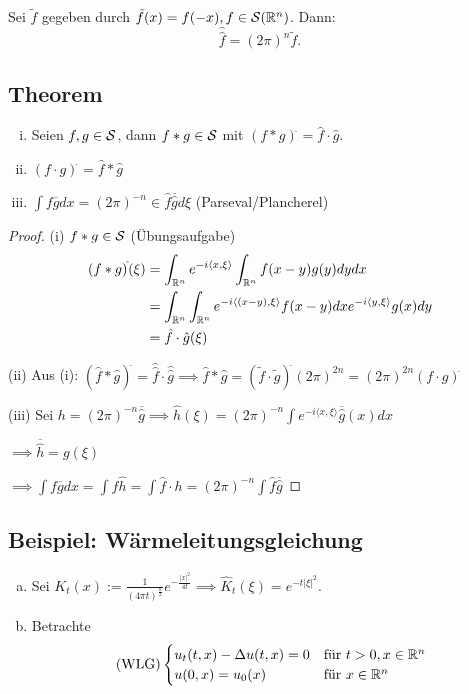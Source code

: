 Sei $\tilde f$ gegeben durch $\tilde f(x) = f(-x), f\in \mathcal{S}(\mathbb{R}^n)$.
Dann:
$$
\hat{\hat{f}} = (2\pi)^n \tilde f.
$$

\subsection{Theorem}

\begin{enumerate}[(i)]
  \item Seien $f, g \in \mathcal{S}$, dann $f \ast g \in \mathcal{S}$ mit $(f \ast g)^{\hat{}} = \hat f \cdot \hat g$.
  \item $(f \cdot g)^{\hat{}} = \hat f \ast \hat g$
  \item $\int f \overline g dx = (2 \pi)^{-n} \in \hat f \overline{\hat g} d\xi$ (Parseval/Plancherel)
\end{enumerate}

\begin{proof}
  (i) $f\ast g \in \mathcal{S}$ (Übungsaufgabe)
\begin{align*}
    (f \ast g)^{\hat{}}(\xi) &= \int_{\mathbb{R}^n} e^{-i \langle x, \xi\rangle} \int_{\mathbb{R}^n} f(x - y) g(y) dy dx \\
    &= \int_{\mathbb{R}^n} \int_{\mathbb{R}^n} e^{-i \langle (x-y), \xi \rangle} f(x-y) dx e^{-i \langle y, \xi\rangle } g(x) dy  \\
    &= \hat f \cdot \hat g (\xi)
\end{align*}

(ii) Aus (i): $(\hat f \ast \hat g)^{\hat{}} = \hat{\hat{f}} \cdot \hat{\hat{g}} \implies \hat f \ast \hat g = (\tilde f \cdot \tilde g)^{\check{}} (2\pi)^{2n} = (2\pi)^{2n} (f \cdot g)^{\hat{}}$

(iii) Sei $h = (2\pi)^{-n} \overline{\hat g} \implies \hat h(\xi) = (2\pi)^{-n} \int e^{-i \langle x, \xi \rangle} \overline{\hat g}(x) dx$

$\implies \overline{\hat h} = g(\xi)$

$\implies \int f \overline g dx = \int f \hat h = \int \hat f \cdot h = (2\pi)^{-n} \int \hat f \overline{\hat g}$
\end{proof}

\subsection{Beispiel: Wärmeleitungsgleichung}

\begin{enumerate}[a)]
  \item Sei $K_t(x) := \frac{1}{(4\pi t)^{\frac{n}{2}}} e^{-\frac{|x|^2}{4t}} \implies \hat K_t(\xi) = e^{-t|\xi|^2}.$

  \item Betrachte
    $$
    \text{(WLG)} 
    \begin{cases}
      u_t(t,x) - \Delta u(t,x) = 0 &\text{für } t > 0, x \in \mathbb{R}^n \\
      u(0,x) = u_0(x) &\text{für } x \in \mathbb{R}^n
    \end{cases}
    $$
\end{enumerate}

